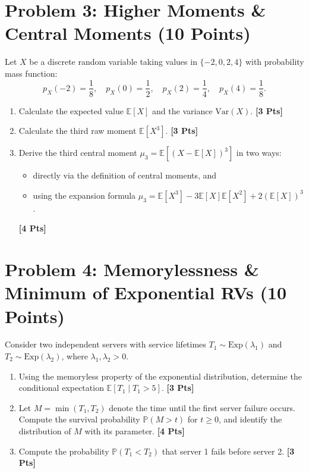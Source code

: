 \documentclass[11pt,a4paper]{article}
\begin{document}
\vspace{0.4cm}

\section*{Problem 3: Higher Moments \& Central Moments \hfill (10 Points)}
Let $X$ be a discrete random variable taking values in $\{-2, 0, 2, 4\}$ with probability mass function:
\[
p_X(-2) = \frac{1}{8}, \quad p_X(0) = \frac{1}{2}, \quad p_X(2) = \frac{1}{4}, \quad p_X(4) = \frac{1}{8}.
\]
\begin{enumerate}[label=(\alph*), itemsep=4pt]
    \item Calculate the expected value $\mathbb{E}[X]$ and the variance $\text{Var}(X)$. \hfill \textbf{[3 Pts]}
    \item Calculate the third raw moment $\mathbb{E}[X^3]$. \hfill \textbf{[3 Pts]}
    \item Derive the third central moment $\mu_3 = \mathbb{E}[(X - \mathbb{E}[X])^3]$ in two ways:
    \begin{itemize}[noitemsep]
        \item directly via the definition of central moments, and
        \item using the expansion formula $\mu_3 = \mathbb{E}[X^3] - 3\mathbb{E}[X]\mathbb{E}[X^2] + 2(\mathbb{E}[X])^3$.
    \end{itemize} \hfill \textbf{[4 Pts]}
\end{enumerate}

\newpage

\section*{Problem 4: Memorylessness \& Minimum of Exponential RVs \hfill (10 Points)}
Consider two independent servers with service lifetimes $T_1 \sim \text{Exp}(\lambda_1)$ and $T_2 \sim \text{Exp}(\lambda_2)$, where $\lambda_1, \lambda_2 > 0$.
\begin{enumerate}[label=(\alph*), itemsep=4pt]
    \item Using the memoryless property of the exponential distribution, determine the conditional expectation $\mathbb{E}[T_1 \mid T_1 > 5]$. \hfill \textbf{[3 Pts]}
    \item Let $M = \min(T_1, T_2)$ denote the time until the first server failure occurs. Compute the survival probability $\mathbb{P}(M > t)$ for $t \ge 0$, and identify the distribution of $M$ with its parameter. \hfill \textbf{[4 Pts]}
    \item Compute the probability $\mathbb{P}(T_1 < T_2)$ that server 1 fails before server 2. \hfill \textbf{[3 Pts]}
\end{enumerate}
\end{document}
